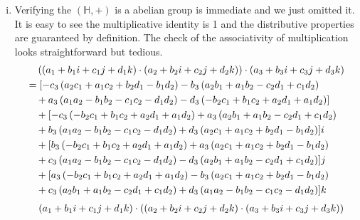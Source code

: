 \documentclass[12pt,letterpaper,boxed]{hmcpset}
\begin{document}
\begin{solution}
	\begin{enumerate}[(i)]
		\item Verifying the $(\mathbb{H},+)$ is a abelian group is immediate and we just omitted it. It is easy to see the multiplicative identity is 1 and the distributive properties are guaranteed by definition. The check of the associativity of multiplication looks straightforward but tedious.
		\begin{align*}
			&\hspace{1.2em}((a_1+b_1i+c_1j+d_1k)\cdot(a_2+b_2i+c_2j+d_2k))\cdot(a_3+b_3i+c_3j+d_3k)\\
			&=[-c_3 \left(a_ 2 c_ 1+a_ 1 c_ 2+b_ 2 d_ 1-b_ 1 d_ 2\right)-b_ 3
			\left(a_ 2 b_ 1+a_ 1 b_ 2-c_ 2 d_ 1+c_ 1 d_ 2\right)\\
			&\hspace{1em}+a_ 3 \left(a_ 1a_ 2-b_ 1b_ 2-c_ 1 c_ 2-d_ 1 d_ 2\right)-d_3\left(-b_2 c_ 1+b_ 1 c_ 2+a_ 2 d_1+a_ 1 d_ 2\right)  ]\\
			&\hspace{1em}+[-c_3 \left(-b_2 c_ 1+b_ 1 c_ 2+a_ 2 d_ 1+a_ 1 d_ 2\right)+a_ 3 \left(a_ 2 b_ 1+a_ 1
			b_ 2-c_ 2 d_ 1+c_ 1 d_ 2\right)\\
			&\hspace{1em}+b_ 3 \left(a_ 1 a_ 2-b_ 1 b_ 2-c_ 1 c_ 2-d_ 1 d_ 2\right)+d_ 3\left(a_ 2 c_ 1+a_ 1 c_ 2+b_ 2 d_ 1-b_ 1 d_ 2\right) ]i\\
			&\hspace{1em}+[b_ 3 \left(-b_2 c_ 1+b_ 1
			c_ 2+a_ 2 d_ 1+a_ 1 d_ 2\right)+a_ 3 \left(a_ 2 c_ 1+a_ 1 c_ 2+b_ 2d_ 1-b_ 1 d_ 2\right)\\
			&\hspace{1em}+c_ 3 \left(a_ 1 a_ 2-b_ 1 b_ 2-c_ 1 c_ 2-d_1d_2\right)-d_ 3\left(a_ 2 b_ 1+a_ 1 b_ 2-c_ 2d_ 1+c_ 1 d_ 2\right) ]j\\
			&\hspace{1em}+[a_ 3 \left(-b_2 c_ 1+b_ 1 c_ 2+a_ 2 d_ 1+a_ 1 d_ 2\right)-b_ 3 \left(a_ 2 c_ 1+a_ 1 c_ 2+b_ 2 d_ 1-b_ 1 d_ 2\right)\\
			&\hspace{1em}+c_ 3 \left(a_2b_ 1+a_ 1 b_ 2-c_ 2d_ 1+c_ 1 d_ 2\right)+d_ 3\left(a_ 1 a_ 2-b_ 1 b_ 2-c_ 1 c_ 2-d_ 1 d_ 2\right) ]k
		\end{align*}
		\begin{align*}
		&\hspace{1.2em}(a_1+b_1i+c_1j+d_1k)\cdot((a_2+b_2i+c_2j+d_2k)\cdot(a_3+b_3i+c_3j+d_3k))\\

\end{align*}
\end{enumerate}
\end{solution}
\end{document}
